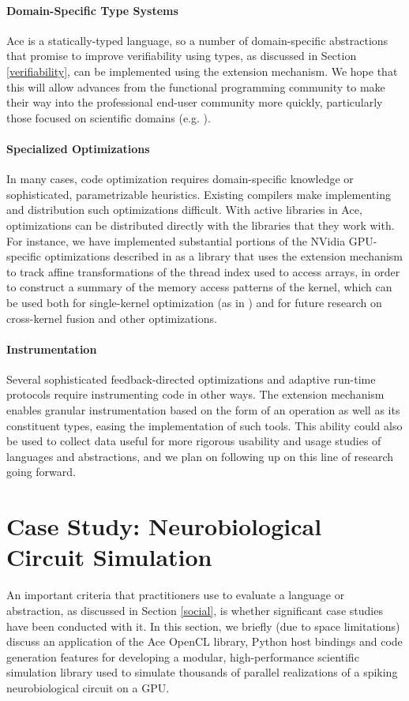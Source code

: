 \documentclass[10pt, conference, compsocconf]{IEEEtran}
\begin{document}
\paragraph{Domain-Specific Type Systems}
Ace is a statically-typed language, so a number of domain-specific abstractions that promise to improve verifiability using types, as discussed in Section \ref{verifiability}, can be implemented using the extension mechanism. We hope that this will allow advances from the functional programming community to make their way into the professional end-user community more quickly, particularly those focused on scientific domains (e.g. \cite{conf/cefp/Kennedy09}).

\paragraph{Specialized Optimizations}
In many cases, code optimization requires domain-specific knowledge or sophisticated, parametrizable heuristics. Existing compilers make implementing and distribution such optimizations difficult. With active libraries in Ace, optimizations can be distributed directly with the libraries that they work with. For instance, we have implemented substantial portions of the NVidia GPU-specific optimizations described in \cite{yang2010gpgpu} as a library that uses the extension mechanism to track affine transformations of the thread index used to access arrays, in order to construct a summary of the memory access patterns of the kernel, which can be used both for single-kernel optimization (as in \cite{yang2010gpgpu}) and for future research on cross-kernel fusion and other optimizations.

\paragraph{Instrumentation}
Several sophisticated feedback-directed optimizations and adaptive run-time protocols require instrumenting code in other ways. The extension mechanism enables granular instrumentation based on the form of an operation as well as its constituent types, easing the implementation of such tools. This ability could also be used to collect data useful for more rigorous usability and usage studies of languages and abstractions, and we plan on following up on this line of research going forward.


\section{Case Study: Neurobiological Circuit Simulation}
An important criteria that practitioners use to evaluate a language or abstraction, as discussed in Section \ref{social}, is whether significant case studies have been conducted with it. In this section, we briefly (due to space limitations) discuss an application of the Ace OpenCL library, Python host bindings and code generation features for developing a modular, high-performance scientific simulation library used to simulate  thousands of parallel realizations of a spiking neurobiological circuit on a GPU.
\end{document}
